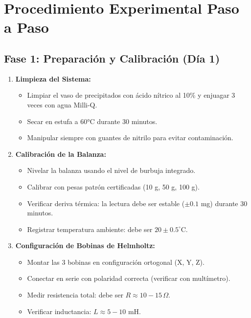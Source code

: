 \documentclass[12pt, a4paper]{article}
\begin{document}
\section{Procedimiento Experimental Paso a Paso}

\subsection{Fase 1: Preparación y Calibración (Día 1)}

\begin{enumerate}[label=\textbf{Paso \arabic*:}, leftmargin=*]
    \item \textbf{Limpieza del Sistema:}
    \begin{itemize}
        \item Limpiar el vaso de precipitados con ácido nítrico al 10\% y enjuagar 3 veces con agua Milli-Q.
        \item Secar en estufa a 60°C durante 30 minutos.
        \item Manipular siempre con guantes de nitrilo para evitar contaminación.
    \end{itemize}
    
    \item \textbf{Calibración de la Balanza:}
    \begin{itemize}
        \item Nivelar la balanza usando el nivel de burbuja integrado.
        \item Calibrar con pesas patrón certificadas (10 g, 50 g, 100 g).
        \item Verificar deriva térmica: la lectura debe ser estable ($\pm 0.1$ mg) durante 30 minutos.
        \item Registrar temperatura ambiente: debe ser $20 \pm 0.5^\circ$C.
    \end{itemize}
    
    \item \textbf{Configuración de Bobinas de Helmholtz:}
    \begin{itemize}
        \item Montar las 3 bobinas en configuración ortogonal (X, Y, Z).
        \item Conectar en serie con polaridad correcta (verificar con multímetro).
        \item Medir resistencia total: debe ser $R \approx 10-15 \, \Omega$.
        \item Verificar inductancia: $L \approx 5-10$ mH.
    \end{itemize}
    

\end{enumerate}
\end{document}

